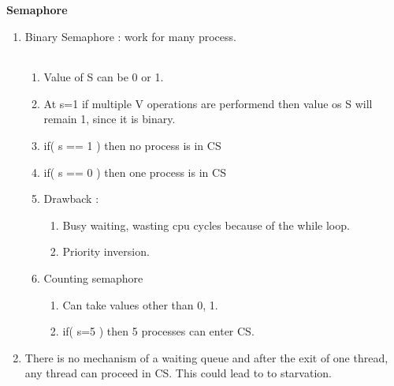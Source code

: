 
\centerline{\textbf{ \LARGE Semaphore}}



\begin{enumerate}

  \item Binary Semaphore : work for many process. \\
      \begin{myTableStyle}
        \begin{tabular}{ |m{4.5cm}|m{5cm}|m{3.5cm}| } \hline
               &
             &
             \\ \hline
        \end{tabular}
      \end{myTableStyle}
  \begin{enumerate}
    \item Value of S can be 0 or 1.
    \item At s=1 if multiple V operations are performend then value os S will remain 1, since it is binary.
    \item if( s == 1 ) then no   process is in CS
    \item if( s == 0 ) then one process is in CS
    \item Drawback :
    \begin{enumerate}
      \item Busy waiting, wasting cpu cycles because of the while loop.
      \item Priority inversion.
  \end{enumerate}
  \item Counting semaphore
  \begin{enumerate}
    \item Can take values other than 0, 1.
    \item if( s=5 ) then 5 processes can enter CS.
  \end{enumerate}
  \end{enumerate}

  \item There is no mechanism of a waiting queue and after the exit of one thread, any thread can proceed in CS.
        This could lead to to starvation.


\end{enumerate}
